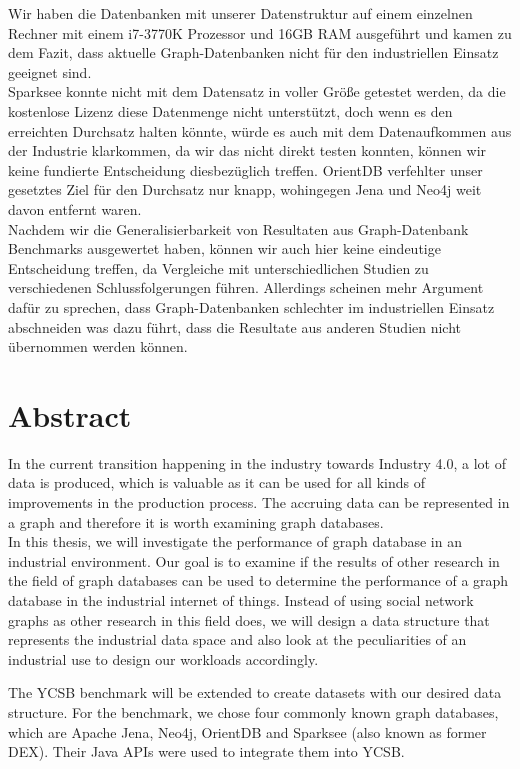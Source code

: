 Wir haben die Datenbanken mit unserer Datenstruktur auf einem einzelnen Rechner mit einem i7-3770K Prozessor und 16GB RAM ausgeführt und kamen zu dem Fazit,
dass aktuelle Graph-Datenbanken nicht für den industriellen Einsatz geeignet sind.\\
Sparksee konnte nicht mit dem Datensatz in voller Größe getestet werden,
da die kostenlose Lizenz diese Datenmenge nicht unterstützt,
doch wenn es den erreichten Durchsatz halten könnte,
würde es auch mit dem Datenaufkommen aus der Industrie klarkommen,
da wir das nicht direkt testen konnten,
können wir keine fundierte Entscheidung diesbezüglich treffen.
OrientDB verfehlter unser gesetztes Ziel für den Durchsatz nur knapp,
wohingegen Jena und Neo4j weit davon entfernt waren.\\
Nachdem wir die Generalisierbarkeit von Resultaten aus Graph-Datenbank Benchmarks ausgewertet haben,
können wir auch hier keine eindeutige Entscheidung treffen,
da Vergleiche mit unterschiedlichen Studien zu verschiedenen Schlussfolgerungen führen.
Allerdings scheinen mehr Argument dafür zu sprechen,
dass Graph-Datenbanken schlechter im industriellen Einsatz abschneiden was dazu führt,
dass die Resultate aus anderen Studien nicht übernommen werden können.

\cleardoublepage

\chapter*{Abstract}

In the current transition happening in the industry towards Industry 4.0,
a lot of data is produced,
which is valuable as it can be used for all kinds of improvements in the production process.
The accruing data can be represented in a graph and therefore it is worth examining graph databases.\\
In this thesis,
we will investigate the performance of graph database in an industrial environment.
Our goal is to examine if the results of other research in the field of graph databases can be used to determine the performance of a graph database in the industrial internet of things.
Instead of using social network graphs as other research in this field does,
we will design a data structure that represents the industrial data space and also look at the peculiarities of an industrial use to design our workloads accordingly.

The YCSB benchmark will be extended to create datasets with our desired data structure.
For the benchmark,
we chose four commonly known graph databases, which are Apache Jena, Neo4j, OrientDB and Sparksee (also known as former DEX).
Their Java APIs were used to integrate them into YCSB.

